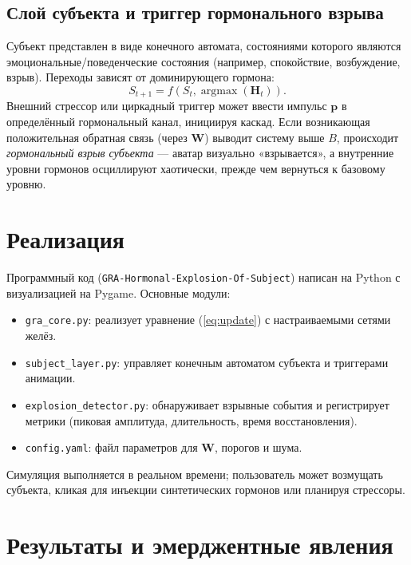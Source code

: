 \documentclass[conference]{IEEEtran}
\begin{document}
\subsection{Слой субъекта и триггер гормонального взрыва}
Субъект представлен в виде конечного автомата, состояниями которого являются эмоциональные/поведенческие состояния (например, спокойствие, возбуждение, взрыв). Переходы зависят от доминирующего гормона:
\begin{equation}
    S_{t+1} = f(S_t, \operatorname{argmax}(\mathbf{H}_t)).
\end{equation}
Внешний стрессор или циркадный триггер может ввести импульс $\mathbf{p}$ в определённый гормональный канал, инициируя каскад. Если возникающая положительная обратная связь (через $\mathbf{W}$) выводит систему выше $B$, происходит \emph{гормональный взрыв субъекта} — аватар визуально «взрывается», а внутренние уровни гормонов осциллируют хаотически, прежде чем вернуться к базовому уровню.

\section{Реализация}
Программный код (\texttt{GRA-Hormonal-Explosion-Of-Subject}) написан на Python с визуализацией на Pygame. Основные модули:
\begin{itemize}
    \item \texttt{gra\_core.py}: реализует уравнение (\ref{eq:update}) с настраиваемыми сетями желёз.
    \item \texttt{subject\_layer.py}: управляет конечным автоматом субъекта и триггерами анимации.
    \item \texttt{explosion\_detector.py}: обнаруживает взрывные события и регистрирует метрики (пиковая амплитуда, длительность, время восстановления).
    \item \texttt{config.yaml}: файл параметров для $\mathbf{W}$, порогов и шума.
\end{itemize}
Симуляция выполняется в реальном времени; пользователь может возмущать субъекта, кликая для инъекции синтетических гормонов или планируя стрессоры.

\section{Результаты и эмерджентные явления}
\end{document}

